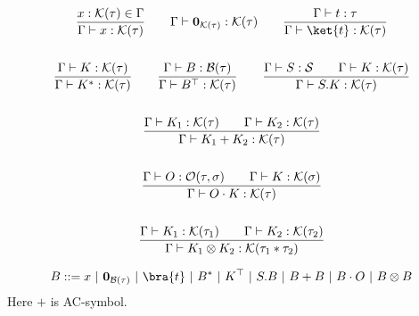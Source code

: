 \begin{definition}
\begin{definition}
  \begin{gather*}
    \frac{x : \mathcal{K}(\tau) \in \Gamma}{\Gamma \vdash x : \mathcal{K}(\tau)}
    \qquad
    \Gamma \vdash \zeroK{\tau} : \mathcal{K}(\tau)
    \qquad
    \frac{\Gamma \vdash t : \tau}{\Gamma \vdash \ket{t} : \mathcal{K}(\tau)} \\
    \\
    \frac{\Gamma \vdash K : \mathcal{K}(\tau)}{\Gamma \vdash K^* : \mathcal{K}(\tau)}
    \qquad
    \frac{\Gamma \vdash B : \mathcal{B}(\tau)}{\Gamma \vdash B^\top : \mathcal{K}(\tau)}
    \qquad
    \frac{\Gamma \vdash S : \mathcal{S} \qquad \Gamma \vdash K : \mathcal{K}(\tau)}{\Gamma \vdash S.K : \mathcal{K}(\tau)} \\
    \\
    \frac{\Gamma \vdash K_1 : \mathcal{K}(\tau) \qquad \Gamma \vdash K_2 : \mathcal{K}(\tau)}{\Gamma \vdash K_1 + K_2 : \mathcal{K}(\tau)} \\
    \\
    \frac{\Gamma \vdash O : \mathcal{O}(\tau, \sigma) \qquad \Gamma \vdash K : \mathcal{K}(\sigma)}{\Gamma \vdash O \cdot K : \mathcal{K}(\tau)} \\
    \\
    \frac{\Gamma \vdash K_1 : \mathcal{K}(\tau_1) \qquad \Gamma \vdash K_2 : \mathcal{K}(\tau_2)}{\Gamma \vdash K_1 \otimes K_2 : \mathcal{K}(\tau_1 * \tau_2)}
  \end{gather*}
\end{definition}


\begin{definition}
  \begin{align*}
    B ::= x\ |\ \zeroB{\tau}\ |\ \bra{t}\ |\ B^*\ |\ K^\top\ |\ S.B\ |\ B + B\ |\ B \cdot O\ |\ B \otimes B
  \end{align*}
  Here $+$ is AC-symbol.
\end{definition}



\end{definition}
